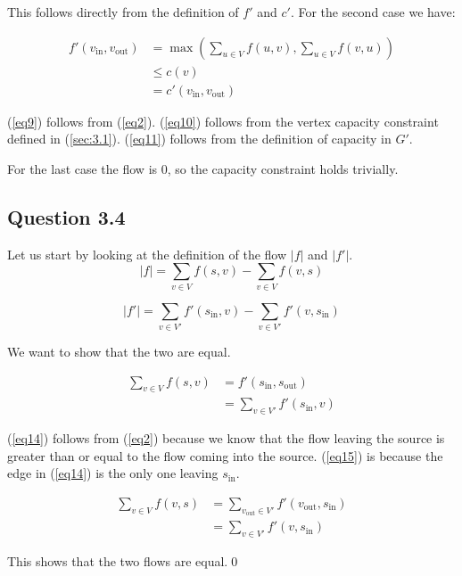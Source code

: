 \documentclass{sig-alternate}
\begin{document}
This follows directly from the definition of $f'$ and $c'$. For the second
case we have:

\begin{align}
    \label{eq9} f'(v_{\text{in}}, v_{\text{out}}) &= \max\left(\sum_{u\in V} f(u, v), \sum_{u\in V} f(v, u)\right) \\
    \label{eq10}    &\leq c(v) \\
    \label{eq11}    &= c'(v_{\text{in}}, v_{\text{out}})
\end{align}

(\ref{eq9}) follows from (\ref{eq2}). (\ref{eq10}) follows from the
vertex capacity constraint defined in (\ref{sec:3.1}).
(\ref{eq11}) follows from the definition of capacity in $G'$.

For the last case the flow is $0$, so the capacity constraint holds trivially.

\subsection*{Question 3.4}

Let us start by looking at the definition of the flow $|f|$ and $|f'|$.
\begin{equation}
    |f| = \sum_{v \in V} f(s,v) - \sum_{v \in V} f(v,s)
\end{equation}

\begin{equation}
    |f'| = \sum_{v \in V'} f'(s_{\text{in}},v) - \sum_{v \in V'} f'(v,s_{\text{in}})
\end{equation}

We want to show that the two are equal.

\begin{align}
    \label{eq14} \sum_{v \in V} f(s, v) &= f'(s_{\text{in}}, s_{\text{out}}) \\
    \label{eq15}    &= \sum_{v \in V'} f'(s_{\text{in}}, v)
\end{align}

(\ref{eq14}) follows from (\ref{eq2}) because we know that the flow leaving
the source is greater than or equal to the flow coming into the source.
(\ref{eq15}) is because the edge in (\ref{eq14}) is the only one leaving
$s_{\text{in}}$.

\begin{align}
    \label{eq16} \sum_{v \in V} f(v, s) &= \sum_{v_{\text{out}} \in V'} f'(v_{\text{out}}, s_{\text{in}}) \\
    \label{eq17}    &= \sum_{v \in V'} f'(v, s_{\text{in}})
\end{align}

This shows that the two flows are equal.\qed


\end{document}
